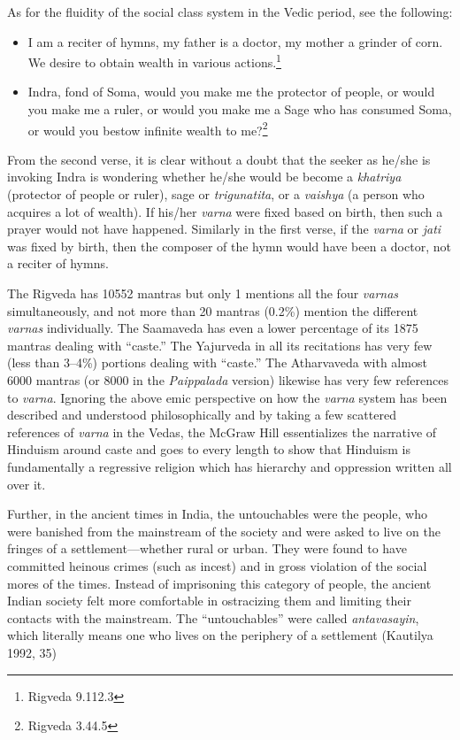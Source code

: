 As for the fluidity of the social class system in the Vedic period, see the following:

\begin{itemize} 
\item I am a reciter of hymns, my father is a doctor, my mother a grinder of corn. We desire to obtain wealth in various actions.\footnote{Rigveda 9.112.3}
\item Indra, fond of Soma, would you make me the protector of people, or would you make me a ruler, or would you make me a Sage who has consumed Soma, or would you bestow infinite wealth to me?\footnote{Rigveda 3.44.5} 
\end{itemize}

From the second verse, it is clear without a doubt that the seeker as he/she is invoking Indra is wondering whether he/she would be become a \textit{khatriya} (protector of people or ruler), sage or \textit{trigunatita},  or a \textit{vaishya} (a person who acquires a lot of wealth). If his/her \textit{varna} were fixed based on birth, then such a prayer would not have happened. Similarly in the first verse, if the \textit{varna} or \textit{jati} was fixed by birth, then the composer of the hymn would have been a doctor, not a reciter of hymns. 

The Rigveda has 10552 mantras but only 1 mentions all the four \textit{varnas} simultaneously, and not more than 20 mantras (0.2\%) mention the different \textit{varnas} individually. The Saamaveda has even a lower percentage of its 1875 mantras dealing with “caste.” The Yajurveda in all its recitations has very few (less than 3--4\%) portions dealing with “caste.” The Atharvaveda with almost 6000 mantras (or 8000 in the \textit{Paippalada} version) likewise has very few references to \textit{varna}. Ignoring the above emic perspective on how the \textit{varna} system has been described and understood philosophically and by taking a few scattered references of \textit{varna} in the Vedas, the McGraw Hill essentializes the narrative of Hinduism around caste and goes to every length to show that Hinduism is fundamentally a regressive religion which has hierarchy and oppression written all over it. 

Further, in the ancient times in India, the untouchables were the people, who were banished from the mainstream of the society and were asked to live on the fringes of a settlement—whether rural or urban. They were found to have committed heinous crimes (such as incest) and in gross violation of the social mores of the times. Instead of imprisoning this category of people, the ancient Indian society felt more comfortable in ostracizing them and limiting their contacts with the mainstream. The “untouchables” were called \textit{antavasayin},  which literally means one who lives on the periphery of a settlement (Kautilya 1992, 35)

